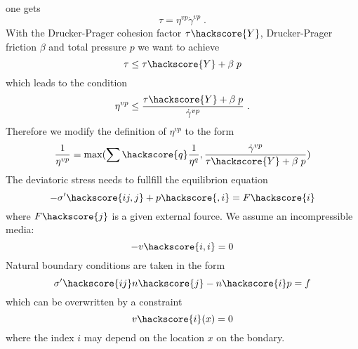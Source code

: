 one gets 
\begin{equation}\label{IKM-EQU-8b}
\tau = \eta^{vp} \dot{\gamma}^{vp} \;.
\end{equation}
With the Drucker-Prager cohesion factor $\tau\hackscore{Y}$, Drucker-Prager friction $\beta$ and total pressure $p$ we want to achieve 
\begin{equation}\label{IKM-EQU-8c}
\tau \le \tau\hackscore{Y} + \beta \; p
\end{equation}
which leads to the condition
\begin{equation}\label{IKM-EQU-8d}
\eta^{vp} \le \frac{\tau\hackscore{Y} + \beta \; p}{ \dot{\gamma}^{vp}} \; .
\end{equation}
Therefore we modify the definition of $\eta^{vp}$ to the form
\begin{equation}\label{IKM-EQU-6b}
\frac{1}{\eta^{vp}}=\max(\sum\hackscore{q} \frac{1}{\eta^{q}}, \frac{\dot{\gamma}^{vp}} {\tau\hackscore{Y} + \beta \; p})
\end{equation}
The deviatoric stress needs to fullfill the equilibrion equation
\begin{equation}\label{IKM-EQU-1}
-\sigma'\hackscore{ij,j}+p\hackscore{,i}=F\hackscore{i}
\end{equation}
where $F\hackscore{j}$ is a given external fource. We assume an incompressible media:
\begin{equation}\label{IKM-EQU-2}
-v\hackscore{i,i}=0
\end{equation}
Natural boundary conditions are taken in the form 
\begin{equation}\label{IKM-EQU-Boundary}
\sigma'\hackscore{ij}n\hackscore{j}-n\hackscore{i}p=f
\end{equation}
which can be overwritten by a constraint 
\begin{equation}\label{IKM-EQU-Boundary0}
v\hackscore{i}(x)=0
\end{equation}
where the index $i$ may depend on the location $x$ on the bondary.

